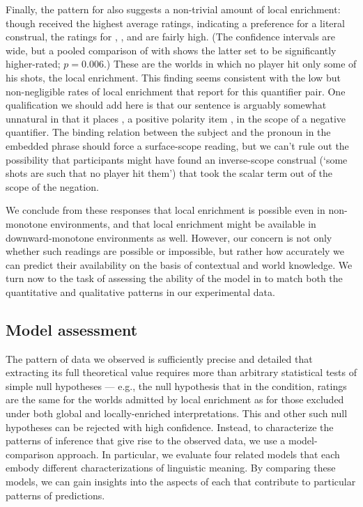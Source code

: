 \documentclass[leqno,12pt]{article}
\begin{document}
Finally, the pattern for  also suggests a non-trivial
amount of local enrichment: though  received the highest
average ratings, indicating a preference for a literal construal, the
ratings for , , and  are fairly high.
(The confidence intervals are wide, but a pooled comparison of
 with
 shows the latter set to be
significantly higher-rated; $p = 0.006$.) These are the worlds in which
no player hit only some of his shots, the local enrichment. This
finding seems consistent with the low but non-negligible rates of
local enrichment that  report for
this quantifier pair. One qualification we should add here is that our
sentence is arguably somewhat unnatural in that it places ,
a positive polarity item \citep{Baker70,Israel96}, in the scope of a
negative quantifier. The binding relation between the subject and the
pronoun  in the embedded phrase should force a surface-scope
reading, but we can't rule out the possibility that participants might
have found an inverse-scope construal (`some shots are such that no
player hit them') that took the scalar term out of the scope of the
negation.

We conclude from these responses that local enrichment is possible
even in non-monotone environments, and that local enrichment might be
available in downward-monotone environments as well. However, our
concern is not only whether such readings are possible or impossible,
but rather how accurately we can predict their availability on the
basis of contextual and world knowledge.  We turn now to the task of
assessing the ability of the model in  to match both
the quantitative and qualitative patterns in our experimental data.


\subsection{Model assessment}

The pattern of data we observed is sufficiently precise and detailed
that extracting its full theoretical value requires more than
arbitrary statistical tests of simple null hypotheses --- e.g., the null
hypothesis that in the  condition, ratings
are the same for the worlds admitted by local enrichment as for those
excluded under both global and locally-enriched interpretations.  This
and other such null hypotheses can be rejected with high confidence.
Instead, to characterize the patterns of inference that give rise to
the observed data, we use a model-comparison approach. In particular,
we evaluate four related models that each embody different
characterizations of linguistic meaning. By comparing these models, we
can gain insights into the aspects of each that contribute to
particular patterns of predictions.
\end{document}
